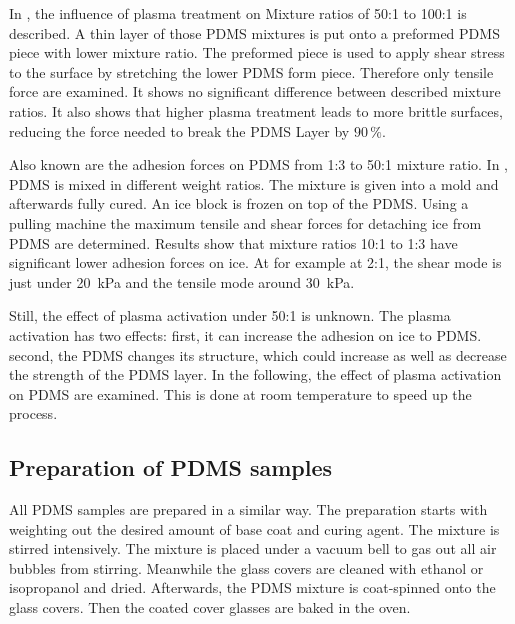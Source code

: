 
In \cite{Ohishi.2017}, the influence of plasma treatment on Mixture ratios of 50:1 to 100:1 is described. A thin layer of those PDMS mixtures is put onto a preformed PDMS piece with lower mixture ratio. The preformed piece is used to apply shear stress to the surface by stretching the lower PDMS form piece. Therefore only tensile force are examined. It shows no significant difference between described mixture ratios. It also shows that higher plasma treatment leads to more brittle surfaces, reducing the force needed to break the PDMS Layer by $90\,\%$.

Also known are the adhesion forces on PDMS from 1:3 to 50:1 mixture ratio. In \cite{IbanezIbanez.2022}, PDMS is mixed in different weight ratios. The mixture is given into a mold and afterwards fully cured. An ice block is frozen on top of the PDMS. Using a pulling machine the maximum tensile and shear forces for detaching ice from PDMS are determined. Results show that mixture ratios 10:1 to 1:3 have significant lower adhesion forces on ice. At for example at 2:1, the shear mode is just under \SI{20}{\kilo\pascal} and the tensile mode around \SI{30}{\kilo\pascal}. 

Still, the effect of plasma activation under 50:1 is unknown. The plasma activation has two effects: first, it can increase the adhesion on ice to PDMS. second, the PDMS changes its structure, which could increase as well as decrease the strength of the PDMS layer. In the following, the effect of plasma activation on PDMS are examined. This is done at room temperature to speed up the process.

\subsection{Preparation of PDMS samples}

All PDMS samples are prepared in a similar way. The preparation starts with weighting out the desired amount of base coat and curing agent. The mixture is stirred intensively. The mixture is placed under a vacuum bell to gas out all air bubbles from stirring. Meanwhile the glass covers are cleaned with ethanol or isopropanol and dried. Afterwards, the PDMS mixture is coat-spinned onto the glass covers. Then the coated cover glasses are baked in the oven.

